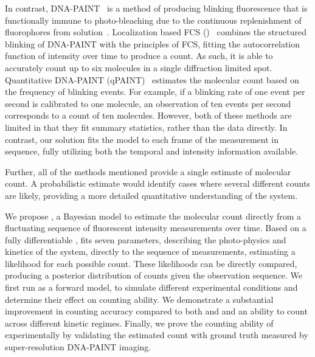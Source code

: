 %
In contrast, DNA-PAINT~\citep{schnitzbauer_2017} is a method of producing
blinking fluorescence that is functionally immune to photo-bleaching due to the
continuous replenishment of fluorophores from solution~\citep{stehr_2021}.
  Localization based FCS (\lbfcs)~\citep{stein_2019,stein_2021} combines the
  structured blinking of DNA-PAINT with the principles of FCS, fitting the
  autocorrelation function of intensity over time to produce a count. As such,
  it is able to accurately count up to six molecules in a single diffraction
  limited spot.
  Quantitative DNA-PAINT (qPAINT)~\citep{jungmann_2016} estimates the molecular
  count based on the frequency of blinking events. For example, if a blinking rate of one
  event per second is calibrated to one molecule, an observation of
  ten events per second corresponds to a count of ten molecules.
  However, both of these methods are limited in that they fit summary
  statistics, rather than the data directly.
  In contrast, our solution fits the model to each frame of the measurement 
  in sequence, fully utilizing both the temporal and intensity information available.
  
Further, all of the methods mentioned provide a single estimate of molecular count. 
  A probabilistic estimate would identify cases where several different counts are likely,
  providing a more detailed quantitative understanding of the system. 

We propose \ours, a Bayesian model to estimate the molecular count
directly from a fluctuating sequence of fluorescent intensity measurements over
time.
  Based on a fully differentiable \hmm, \ours fits
  seven parameters, describing the photo-physics and kinetics of the system, 
  directly to the sequence of measurements, 
  estimating a likelihood for each possible count.
  These likelihoods can be directly compared, producing a posterior
  distribution of counts given the observation sequence.
  We first run \ours as a forward model, to simulate
  different experimental conditions and determine their effect on counting ability.
  We demonstrate a substantial improvement in counting accuracy compared to both \lbfcs and \qpaint
  and an ability to count across different kinetic regimes.
  Finally, we prove the counting ability of \ours experimentally by validating 
  the estimated count with ground truth measured by super-resolution DNA-PAINT imaging.

